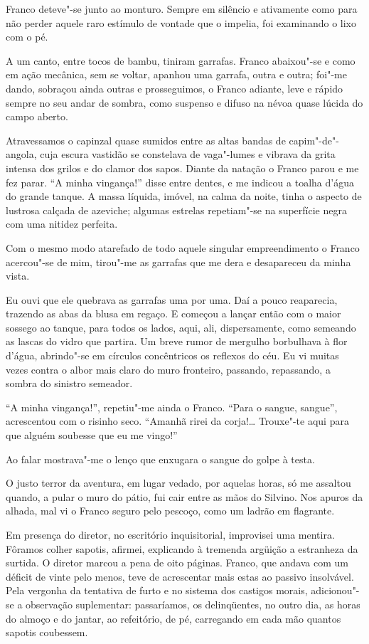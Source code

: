 Franco deteve"-se junto ao
monturo. Sempre em silêncio e ativamente como para não perder aquele
raro estímulo de vontade que o impelia, foi examinando o lixo com o pé.

A um canto, entre tocos de bambu, tiniram garrafas. Franco abaixou"-se
e como em ação mecânica, sem se voltar, apanhou uma garrafa, outra e
outra; foi"-me dando, sobraçou ainda outras e prosseguimos, o Franco
adiante, leve e rápido sempre no seu andar de sombra, como suspenso e
difuso na névoa quase lúcida do campo aberto. 

Atravessamos o capinzal
quase sumidos entre as altas bandas de capim"-de"-angola, cuja escura
vastidão se constelava de vaga"-lumes e vibrava da grita intensa dos
grilos e do clamor dos sapos. Diante da natação o Franco parou e me fez
parar. ``A minha vingança!'' disse entre dentes, e me indicou a toalha
d'água do grande tanque. A massa líquida, imóvel, na calma da noite,
tinha o aspecto de lustrosa calçada de azeviche; algumas estrelas
repetiam"-se na superfície negra com uma nitidez perfeita. 

Com o mesmo
modo atarefado de todo aquele singular empreendimento o Franco
acercou"-se de mim, tirou"-me as garrafas que me dera e desapareceu
da minha vista. 

Eu ouvi que ele quebrava as garrafas uma por uma. Daí a
pouco reaparecia, trazendo as abas da blusa em regaço. E começou a
lançar então com o maior sossego ao tanque, para todos os lados, aqui,
ali, dispersamente, como semeando as lascas do vidro que partira. Um
breve rumor de mergulho borbulhava à flor d'água, abrindo"-se em
círculos concêntricos os reflexos do céu. Eu vi muitas vezes contra o
albor mais claro do muro fronteiro, passando, repassando, a sombra do
sinistro semeador. 

``A minha vingança!'', repetiu"-me ainda o Franco.
``Para o sangue, sangue'', acrescentou com o risinho seco. ``Amanhã rirei
da corja!\ldots{} Trouxe"-te aqui para que alguém soubesse que eu me vingo!'' 

Ao falar mostrava"-me o lenço que enxugara o sangue do golpe à testa. 

O justo terror da aventura, em lugar vedado, por aquelas horas,
só me assaltou quando, a pular o muro do pátio, fui cair entre as mãos
do Silvino. Nos apuros da alhada, mal vi o Franco seguro pelo pescoço,
como um ladrão em flagrante. 

Em presença do diretor, no escritório
inquisitorial, improvisei uma mentira. Fôramos colher sapotis, afirmei,
explicando à tremenda argüição a estranheza da surtida. O diretor
marcou a pena de oito páginas. Franco, que andava com um déficit de
vinte pelo menos, teve de acrescentar mais estas ao passivo insolvável.
Pela vergonha da tentativa de furto e no sistema dos castigos morais,
adicionou"-se a observação suplementar: passaríamos, os delinqüentes, no
outro dia, as horas do almoço e do jantar, ao refeitório, de pé, 
carregando em cada mão quantos sapotis coubessem. 

